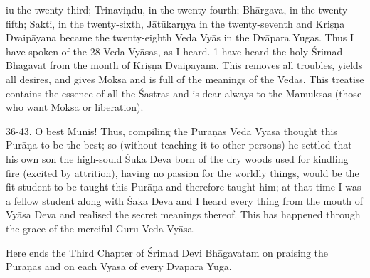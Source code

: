iu the twenty-third; Trinavi\d{n}du, in the twenty-fourth; Bh\=argava, in the twenty-fifth; Sakti, in the twenty-sixth, J\=at\=ukar\d{n}ya in the twenty-seventh and Kri\d{s}\d{n}a Dvaip\=ayana became the twenty-eighth Veda Vy\=as in the Dv\=apara Yugas. Thus I have spoken of the 28 Veda Vy\=asas, as I heard. 1 have heard the holy \'Srimad Bh\=agavat from the month of Kri\d{s}\d{n}a Dvaipayana. This removes all troubles, yields all desires, and gives Moksa and is full of the meanings of the Vedas. This treatise contains the essence of all the \'Sastras and is dear always to the Mamuksas (those who want Moksa or liberation).

36-43. O best Munis! Thus, compiling the Pur\=a\d{n}as Veda Vy\=asa thought this Pur\=a\d{n}a to be the best; so (without teaching it to other persons) he settled that his own son the high-sould \'Suka Deva born of the dry woods used for kindling fire (excited by attrition), having no passion for the worldly things, would be the fit student to be taught this Pur\=a\d{n}a and therefore taught him; at that time I was a fellow student along with \'Saka Deva and I heard every thing from the mouth of Vy\=asa Deva and realised the secret meanings thereof. This has happened through the grace of the merciful Guru Veda Vy\=asa.

Here ends the Third Chapter of \'Srimad Devi Bh\=agavatam on praising the Pur\=a\d{n}as and on each Vy\=asa of every Dv\=apara Yuga.



